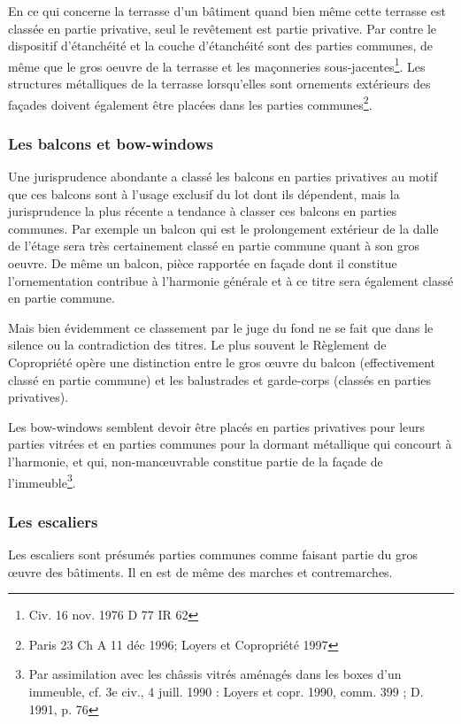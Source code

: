 		En ce qui concerne la terrasse d'un bâtiment quand bien même cette terrasse est classée en partie
		privative, seul le revêtement est partie privative. Par contre le dispositif d'étanchéité et la couche
		d'étanchéité sont des parties communes, de même que le gros oeuvre de la terrasse et les maçonneries
		sous-jacentes\footnote{Civ. 16 nov. 1976 D 77 IR 62}.
		Les structures métalliques de la terrasse lorsqu’elles sont ornements extérieurs des façades doivent
		également être placées dans les parties communes\footnote{Paris 23\degre{} Ch A 11 déc 1996; Loyers et Copropriété 1997 }.
		
		\subsubsection{Les balcons et bow-windows}
		
		Une jurisprudence abondante a classé les balcons en parties privatives au motif que ces balcons sont à
		l'usage exclusif du lot dont ils dépendent, mais la jurisprudence la plus récente a tendance à classer ces
		balcons en parties communes. Par exemple un balcon qui est le prolongement extérieur de la dalle de
		l'étage sera très certainement classé en partie commune quant à son gros oeuvre. De même un balcon,
		pièce rapportée en façade dont il constitue l'ornementation contribue à l'harmonie générale et à ce titre
		sera également classé en partie commune.
		
		Mais bien évidemment ce classement par le juge du fond ne se fait que dans le silence ou la contradiction
		des titres. Le plus souvent le Règlement de Copropriété opère une distinction entre le gros œuvre du
		balcon (effectivement classé en partie commune) et les balustrades et garde-corps (classés en parties
		privatives).
		
		Les bow-windows semblent devoir être placés en parties privatives pour leurs parties vitrées et en parties
		communes pour la dormant métallique qui concourt à l'harmonie, et qui, non-manœuvrable constitue
		partie de la façade de l'immeuble\footnote{Par assimilation avec les châssis vitrés aménagés dans les boxes d’un immeuble, cf. 3e civ., 4 juill. 1990 : Loyers et copr. 1990, comm. 399 ; D. 1991, p. 76}.
		
		\subsubsection{Les escaliers}
		
		Les escaliers sont présumés parties communes comme faisant partie du gros œuvre des bâtiments. Il en
		est de même des marches et contremarches.
		
